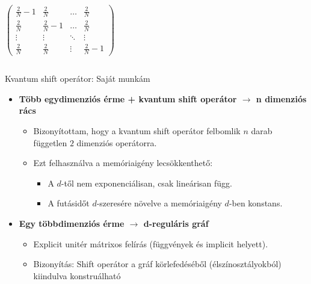\documentclass[aspectratio=169]{beamer}
\begin{document}
\begin{frame}
\begin{columns}[t,onlytextwidth]
\begin{column}{.5\textwidth}
\begin{center}
        \addvspace{10pt}
        
$
\begin{pmatrix}
      \frac{2}{N} - 1 & \frac{2}{N} & \dots  & \frac{2}{N} \\
      \frac{2}{N} & \frac{2}{N} - 1 & \dots  & \frac{2}{N} \\
      \vdots & \vdots & \ddots & \vdots \\
      \frac{2}{N} & \frac{2}{N} & \vdots & \frac{2}{N} - 1
    \end{pmatrix}
$


      \end{center}
    \end{column}
  \end{columns}
\end{frame}


\begin{frame}{Kvantum shift operátor: Saját munkám}
\begin{itemize}
    \item \textbf{Több egydimenziós érme + kvantum shift operátor $\rightarrow$ n dimenziós rács}
    \begin{itemize}
        \item Bizonyítottam, hogy a kvantum shift operátor felbomlik $n$ darab független $2$ dimenziós operátorra.
        \item Ezt felhasználva a memóriaigény lecsökkenthető:
        \begin{itemize}
            \item A $d$-től nem exponenciálisan, csak lineárisan függ.
            \item A futásidőt $d$-szeresére növelve a memóriaigény $d$-ben konstans.
        \end{itemize}
    \end{itemize}
    \item \textbf{Egy többdimenziós érme $\rightarrow$ d-reguláris gráf}
    \begin{itemize}
        \item Explicit unitér mátrixos felírás (függvények és implicit helyett).
        \item Bizonyítás: Shift operátor a gráf körlefedéséből (élszínosztályokból) kiindulva konstruálható
    \end{itemize}
\end{itemize}
\end{frame}
\end{document}
